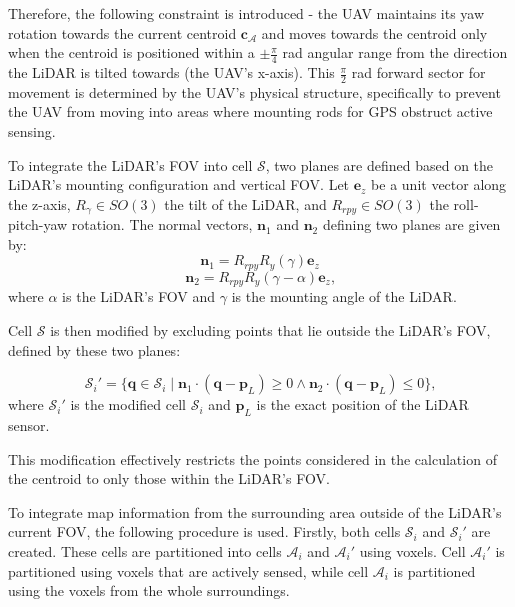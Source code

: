             Therefore, the following constraint is introduced - the \ac{UAV} maintains its yaw rotation towards the current centroid $\mathbf{c}_{\mathcal{A}}$ and moves towards the centroid only when the centroid is positioned within a $\pm \frac{\pi}{4}$ rad angular range from the direction the \ac{LiDAR} is tilted towards (the \ac{UAV}'s x-axis).
            This $\frac{\pi}{2}$ rad forward sector for movement is determined by the \ac{UAV}'s physical structure, specifically to prevent the \ac{UAV} from moving into areas where mounting rods for GPS obstruct active sensing.

            To integrate the \ac{LiDAR}'s \ac{FOV} into cell $\mathcal{S}$, two planes are defined based on the \ac{LiDAR}'s mounting configuration and vertical \ac{FOV}.
            Let $\mathbf{e}_z$ be a unit vector along the z-axis, $R_{\gamma} \in SO(3)$ the tilt of the \ac{LiDAR}, and $R_{rpy} \in SO(3)$ the roll-pitch-yaw rotation.
            The normal vectors, $\mathbf{n}_1$ and $\mathbf{n}_2$ defining two planes are given by:
            \begin{equation}
                \mathbf{n}_1 = R_{rpy} R_{y}(\gamma)  \mathbf{e}_z    
            \end{equation}
            \begin{equation}
                \mathbf{n}_2 = R_{rpy} R_{y}(\gamma - \alpha) \mathbf{e}_z  \text{,}
            \end{equation}
            where $\alpha$ is the \ac{LiDAR}'s \ac{FOV} and $\gamma$ is the mounting angle of the \ac{LiDAR}.

            Cell $\mathcal{S}$ is then modified by excluding points that lie outside the \ac{LiDAR}'s \ac{FOV}, defined by these two planes: 

            \begin{equation}
                \mathcal{S}_i' = \{ \mathbf{q} \in \mathcal{S}_i \mid \mathbf{n}_1 \cdot (\mathbf{q} - \mathbf{p}_{L}) \geq 0 \land \mathbf{n}_2 \cdot (\mathbf{q} - \mathbf{p}_{L}) \leq 0 \}\text{,}
            \end{equation}
            where $\mathcal{S}_i'$ is the modified cell $\mathcal{S}_i$ and $\mathbf{p}_{L}$ is the exact position of the LiDAR sensor.

            This modification effectively restricts the points considered in the calculation of the centroid to only those within the \ac{LiDAR}'s \ac{FOV}.

            To integrate map information from the surrounding area outside of the \ac{LiDAR}'s current \ac{FOV}, the following procedure is used.
            Firstly, both cells $\mathcal{S}_i$ and $\mathcal{S}_i'$ are created. These cells are partitioned into cells $\mathcal{A}_i$ and $\mathcal{A}_i'$ using voxels. 
            Cell $\mathcal{A}_i'$ is partitioned using voxels that are actively sensed, while cell $\mathcal{A}_i$ is partitioned using the voxels from the whole surroundings.

